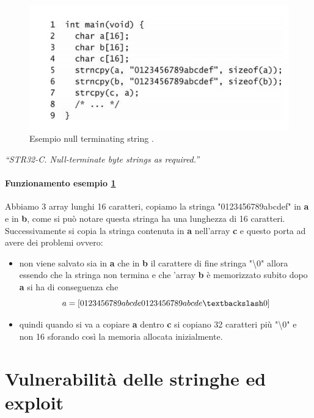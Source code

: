 \begin{figure}[H]
	\centering
    \includegraphics[width=14cm, keepaspectratio]{santini/img/cap_2/null_string.png}
	\caption{Esempio null terminating string .}\label{fig:null_string}
\end{figure}
\textit{“STR32-C. Null-terminate byte strings as
required.”}

\paragraph{Funzionamento esempio \ref{fig:null_string}} 
Abbiamo 3 array lunghi 16 caratteri, copiamo la stringa "0123456789abcdef" in \textbf{a} e in \textbf{b}, come si può notare questa stringa ha una lunghezza di 16 caratteri. Successivamente si copia la stringa contenuta in \textbf{a} nell'array \textbf{c} e questo porta ad avere dei problemi ovvero:
\begin{itemize}
    \item non viene salvato sia in \textbf{a} che in \textbf{b} il carattere di fine stringa "\textbackslash0" allora essendo che la stringa non termina e che 'array \textbf{b} è memorizzato subito dopo \textbf{a} si ha di conseguenza che 
    \[a = [0123456789abcde0123456789abcde\textbackslash0]\]
    \item quindi quando si va a copiare \textbf{a} dentro \textbf{c} si copiano 32 caratteri più "\textbackslash0" e non 16 sforando così la memoria allocata inizialmente.
\end{itemize}
\section{Vulnerabilità delle stringhe ed exploit}
